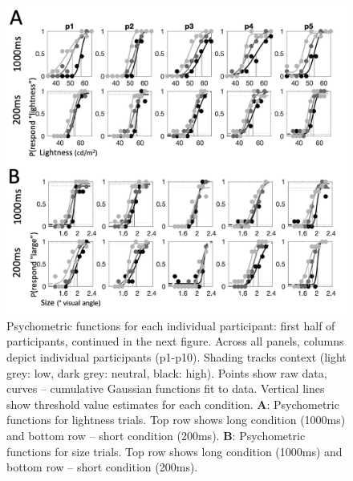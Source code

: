 \documentclass[a4paper, nobind]{templates/ociamthesis}
\begin{document}
\begin{figure}

{\centering \includegraphics[width=0.9\linewidth]{figures/cat-psychom-ppt-a} 

}

\caption[Experiment 1, Psychometric functions, part 1]{Psychometric functions for each individual participant: first half of participants, continued in the next figure. Across all panels, columns depict individual participants (p1-p10). Shading tracks context (light grey: low, dark grey: neutral, black: high). Points show raw data, curves -- cumulative Gaussian functions fit to data. Vertical lines show threshold value estimates for each condition. $\textbf{A:}$ Psychometric functions for lightness trials. Top row shows long condition (1000ms) and bottom row -- short condition (200ms). $\textbf{B:}$ Psychometric functions for size trials. Top row shows long condition (1000ms) and bottom row -- short condition (200ms). }\label{fig:cat-psychom-ppt-a}
\end{figure}
\end{document}
